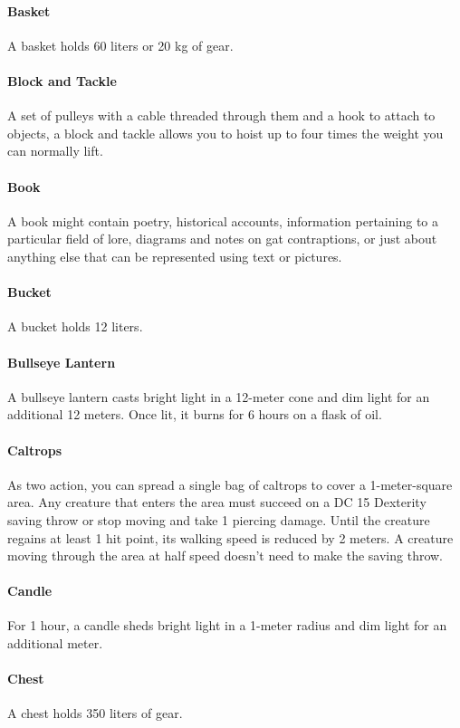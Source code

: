     \paragraph{Basket}
        A basket holds 60 liters or 20 kg of gear.
    \paragraph{Block and Tackle}
        A set of pulleys with a cable threaded through them and a hook to attach to objects, a block and tackle allows you to hoist up to four times the weight you can normally lift.
    \paragraph{Book}
        A book might contain poetry, historical accounts, information pertaining to a particular field of lore, diagrams and notes on gat contraptions, or just about anything else that can be represented using text or pictures.
    \paragraph{Bucket}
        A bucket holds 12 liters.
    \paragraph{Bullseye Lantern}
        A bullseye lantern casts bright light in a 12-meter cone and dim light for an additional 12 meters.
        Once lit, it burns for 6 hours on a flask of oil.
    \paragraph{Caltrops}
        As two action, you can spread a single bag of caltrops to cover a 1-meter-square area.
        Any creature that enters the area must succeed on a DC 15 Dexterity saving throw or stop moving and take 1 piercing damage.
        Until the creature regains at least 1 hit point, its walking speed is reduced by 2 meters.
        A creature moving through the area at half speed doesn't need to make the saving throw.
    \paragraph{Candle}
        For 1 hour, a candle sheds bright light in a 1-meter radius and dim light for an additional meter.
    \paragraph{Chest}
        A chest holds 350 liters of gear.
